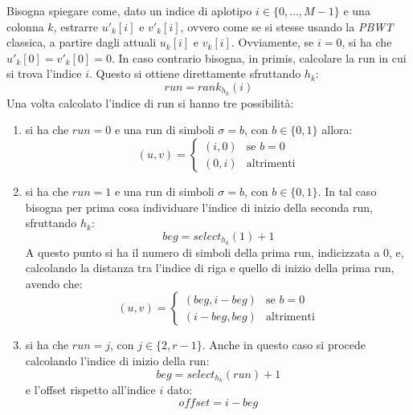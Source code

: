 Bisogna spiegare come, dato un indice di aplotipo $i\in\{0,\ldots,M-1\}$ e una
colonna $k$, estrarre $u'_k[i]$ e $v'_k[i]$, ovvero come se si stesse usando la
\textit{PBWT} classica, a partire dagli attuali $u_k[i]$ e $v_k[i]$. Ovviamente,
se $i=0$, si ha che $u'_k[0]=v'_k[0]=0$. In caso contrario bisogna, in primis,
calcolare la run 
in cui si trova l'indice $i$. Questo si ottiene direttamente sfruttando $h_k$:
\begin{equation}
  \label{eq:bv7}
  run = rank_{h_k}(i)
\end{equation}
Una volta calcolato l'indice di run si hanno tre possibilità:
\begin{enumerate}
  \item si ha che $run=0$ e una run di simboli $\sigma=b$, con $b\in\{0,1\}$
  allora:
  \begin{equation}
    \label{eq:bv8}
    (u,v)=
    \begin{cases}
      (i,0)&\mbox{se } b=0\\
      (0,i)&\mbox{altrimenti}
    \end{cases}
  \end{equation}
  \item si ha che $run=1$ e una run di simboli $\sigma=b$, con $b\in\{0,1\}$. In
  tal caso bisogna per prima cosa individuare l'indice di inizio della seconda
  run, sfruttando $h_k$:
  \begin{equation}
    \label{eq:bv9}
    beg = select_{h_k}(1)+1
  \end{equation}
  A questo punto si ha il numero di simboli della prima run, indicizzata a 0, e,
  calcolando la distanza tra l'indice di riga e quello di inizio della prima
  run, avendo che:
  \begin{equation}
    \label{eq:bv10}
    (u,v)=
    \begin{cases}
      (beg,i-beg)&\mbox{se } b=0\\
      (i-beg,beg)&\mbox{altrimenti}
    \end{cases}
  \end{equation}
  \item si ha che $run=j$, con $j\in\{2,r-1\}$. Anche in questo caso  si procede
  calcolando l'indice di inizio della run:
  \begin{equation}
    \label{eq:bv11}
    beg = select_{h_k}(run)+1
  \end{equation}
  e l'offset rispetto all'indice $i$ dato:
  \begin{equation}
    \label{eq:bv12}
    offset = i-beg
  \end{equation}

\end{enumerate}
